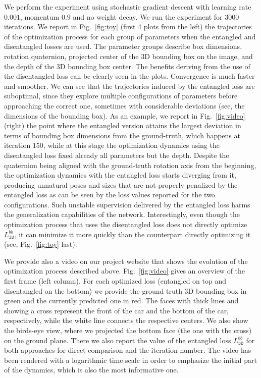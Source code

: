 \documentclass[10pt,twocolumn,letterpaper]{article}
\begin{document}
We perform the experiment using stochastic gradient descent with learning rate $0.001$, momentum $0.9$ and no weight decay. We run the experiment for $3000$ iterations. We report in Fig.~\ref{fig:toy} (first 4 plots from the left) the trajectories of the optimization process for each group of parameters when the entangled and disentangled losses are used. The parameter groups describe box dimensions, rotation quaternion, projected center of the 3D bounding box on the image, and the depth of the 3D bounding box center. The benefits deriving from the use of the disentangled loss can be clearly seen in the plots. Convergence is much faster and smoother. We can see that the trajectories induced by the entangled loss are suboptimal, since they explore multiple configurations of parameters before approaching the correct one, sometimes with considerable deviations (see, \eg the dimensions of the bounding box).
As an example, we report in Fig.~\ref{fig:video} (right) the point where the entangled version attains the largest deviation in terms of bounding box dimensions from the ground-truth, which happens at iteration $150$, while at this stage the optimization dynamics using the disentangled loss fixed already all parameters but the depth. Despite the quaternion being aligned with the ground-truth rotation axis from the beginning, the optimization dynamics with the entangled loss starts diverging from it, producing unnatural poses and sizes that are not properly penalized by the entangled loss as can be seen by the loss values reported for the two configurations. Such unstable supervision delivered by the entangled loss harms the generalization capabilities of the network. Interestingly, even though the optimization process that uses the disentangled loss does not directly optimize $L_\mathtt{3D}^{bb}$, it can minimize it more quickly than the counterpart directly optimizing it (see, Fig.~\ref{fig:toy} last).


We provide also a video on our project website that shows the evolution of the optimization process described above. Fig.~\ref{fig:video} gives an overview of the first frame (left column). For each optimized loss (entangled on top and disentangled on the bottom) we provide the ground truth 3D bounding box in green and the currently predicted one in red. The faces with thick lines and showing a cross represent the front of the car and the bottom of the car, respectively, while the white line connects the respective centers. We also show the birds-eye view, where we projected the bottom face (the one with the cross) on the ground plane. There we also report the value of the entangled loss $L_\mathtt{3D}^{bb}$ for both approaches for direct comparison and the iteration number. The video has been rendered with a logarithmic time scale in order to emphasize the initial part of the dynamics, which is also the most informative one.
\end{document}
